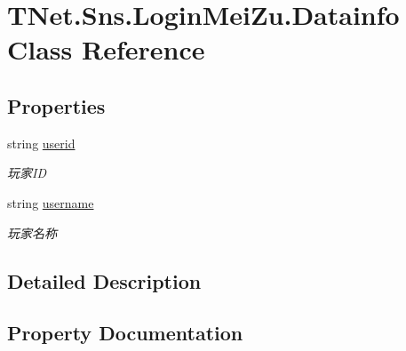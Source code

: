 \hypertarget{class_t_net_1_1_sns_1_1_login_mei_zu_1_1_datainfo}{}\section{T\+Net.\+Sns.\+Login\+Mei\+Zu.\+Datainfo Class Reference}
\label{class_t_net_1_1_sns_1_1_login_mei_zu_1_1_datainfo}


 


\subsection*{Properties}
\begin{DoxyCompactItemize}
\item 
string \mbox{\hyperlink{class_t_net_1_1_sns_1_1_login_mei_zu_1_1_datainfo_a19e641c90407cdfd291e25e835d56bb2}{userid}}
\begin{DoxyCompactList}\small\item\em 玩家\+ID \end{DoxyCompactList}\item 
string \mbox{\hyperlink{class_t_net_1_1_sns_1_1_login_mei_zu_1_1_datainfo_a3b683b8a9753443d4d4170a15c771e34}{username}}
\begin{DoxyCompactList}\small\item\em 玩家名称 \end{DoxyCompactList}\end{DoxyCompactItemize}


\subsection{Detailed Description}




\subsection{Property Documentation}
\mbox{\label{class_t_net_1_1_sns_1_1_login_mei_zu_1_1_datainfo_a19e641c90407cdfd291e25e835d56bb2}} 
